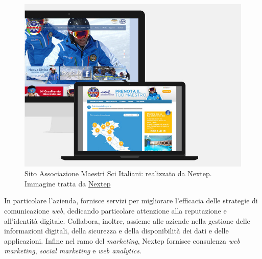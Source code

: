 \begin{figure}[h]
\centering
\includegraphics[scale=0.35]{immagini/amsi.jpg}
\caption{Sito Associazione Maestri Sci Italiani: realizzato da Nextep. Immagine tratta da \href{http://www.nextep.it/}{Nextep}}
\label{fig:amsi}
\end{figure}
In particolare l'azienda, fornisce servizi per migliorare l'efficacia delle strategie di comunicazione \emph{web}, dedicando particolare attenzione alla reputazione e all'identità digitale. Collabora, inoltre, assieme alle aziende nella gestione delle informazioni digitali, della sicurezza e della disponibilità dei dati e delle applicazioni. Infine nel ramo del \emph{marketing}, Nextep fornisce consulenza \emph{web marketing}, \emph{social marketing} e \emph{web analytics}.

